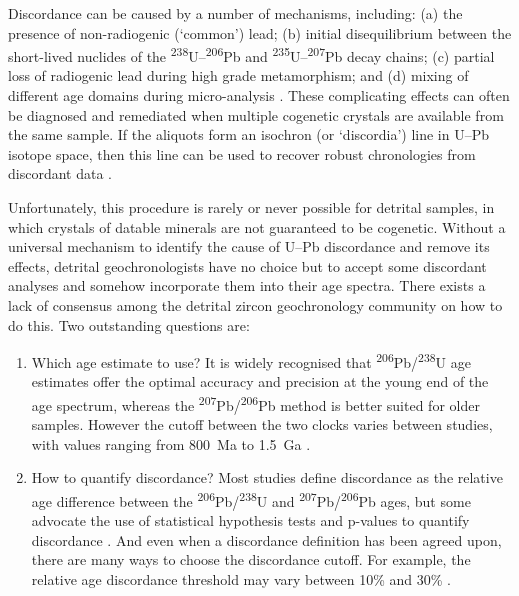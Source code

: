 \documentclass[gchron, manuscript]{copernicus}
\begin{document}
Discordance can be caused by a number of mechanisms, including: (a)
the presence of non-radiogenic (`common') lead; (b) initial
disequilibrium between the short-lived nuclides of the
\textsuperscript{238}U--\textsuperscript{206}Pb and
\textsuperscript{235}U--\textsuperscript{207}Pb decay chains; (c)
partial loss of radiogenic lead during high grade metamorphism; and
(d) mixing of different age domains during micro-analysis
\citep{schoene2014}. These complicating effects can often be diagnosed
and remediated when multiple cogenetic crystals are available from the
same sample. If the aliquots form an isochron (or `discordia') line in
U--Pb isotope space, then this line can be used to recover robust
chronologies from discordant data \citep{ludwig1998}.

Unfortunately, this procedure is rarely or never possible for detrital
samples, in which crystals of datable minerals are not guaranteed to
be cogenetic.  Without a universal mechanism to identify the cause of
U--Pb discordance and remove its effects, detrital geochronologists
have no choice but to accept some discordant analyses and somehow
incorporate them into their age spectra.  There exists a lack of
consensus among the detrital zircon geochronology community on how to
do this.  Two outstanding questions are:

\begin{enumerate}
\item Which age estimate to use? It is widely recognised that
  \textsuperscript{206}Pb/\textsuperscript{238}U age estimates offer
  the optimal accuracy and precision at the young end of the age
  spectrum, whereas the
  \textsuperscript{207}Pb/\textsuperscript{206}Pb method is better
  suited for older samples. However the cutoff between the two clocks
  varies between studies, with values ranging from 800~Ma to 1.5~Ga
  \citep{gehrels2011,spencer2016}.
\item How to quantify discordance?  Most studies define discordance as
  the relative age difference between the
  \textsuperscript{206}Pb/\textsuperscript{238}U and
  \textsuperscript{207}Pb/\textsuperscript{206}Pb ages, but some
  advocate the use of statistical hypothesis tests and p-values to
  quantify discordance \citep{spencer2016}. And even when a
  discordance definition has been agreed upon, there are many ways to
  choose the discordance cutoff. For example, the relative age
  discordance threshold may vary between 10\% and 30\%
  \citep{gehrels2011}.
\end{enumerate}
\end{document}
